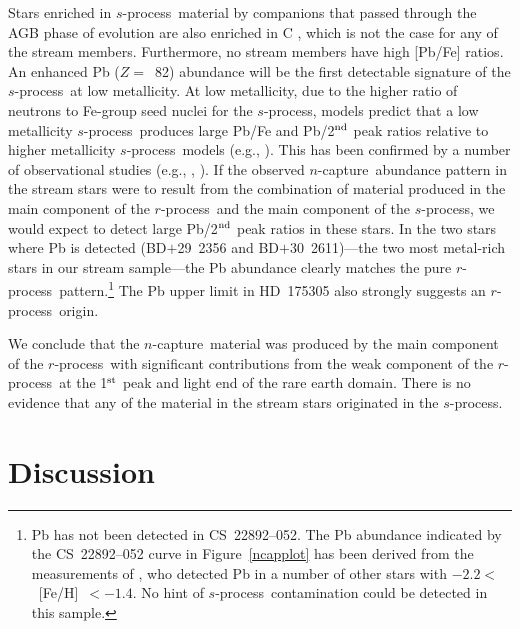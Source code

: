\documentclass{emulateapj}
\def\rpro{\mbox{$r$-process}}
\def\spro{\mbox{$s$-process}}
\def\ncap{\mbox{$n$-capture}}
\begin{document}
Stars enriched in \spro\ material by companions that passed through the
AGB phase of evolution are also enriched in C \citep{sneden03b}, 
which is not the case for any of the stream members.
Furthermore, no stream members have high [Pb/Fe] ratios.
An enhanced Pb ($Z =$~82) abundance will be the first 
detectable signature of the \spro\ at low metallicity.
At low metallicity, due to the higher ratio of neutrons 
to Fe-group seed nuclei for the \spro, 
models predict that a low metallicity \spro\ produces large
Pb/Fe and Pb/2$^{\rm nd}$ peak ratios 
relative to higher metallicity \spro\ models
(e.g., \citealt{gallino98}).
This has been confirmed by a number of observational studies
(e.g., \citealt{vaneck03}, \citealt{ivans05}).
If the observed \ncap\ abundance pattern in the stream stars
were to result from the combination of material produced in the
main component of the \rpro\ and the main component of the \spro,
we would expect to detect large Pb/2$^{\rm nd}$ peak ratios
in these stars.
In the two stars where Pb is detected (\mbox{BD$+$29~2356} and
\mbox{BD$+$30~2611})---the two most metal-rich stars 
in our stream sample---the Pb abundance clearly matches 
the pure \rpro\ pattern.\footnote{
Pb has not been detected in \mbox{CS~22892--052}. 
The Pb abundance indicated by the \mbox{CS~22892--052} curve
in Figure~\ref{ncapplot} has been derived from the measurements
of \citet{roederer09b}, who detected Pb in a number of other
stars with $-2.2 <$~[Fe/H]~$< -1.4$.
No hint of \spro\ contamination could be detected in this sample.
}
The Pb upper limit in \mbox{HD~175305} also strongly suggests
an \rpro\ origin.

We conclude that the \ncap\ material was produced by the main 
component of the \rpro\ 
with significant contributions from the weak component of the \rpro\
at the 1$^{\rm st}$ peak and light end of the rare earth domain.
There is no evidence that any of the material in the
stream stars originated in the \spro.


\section{Discussion}
\label{discussion}
\end{document}
